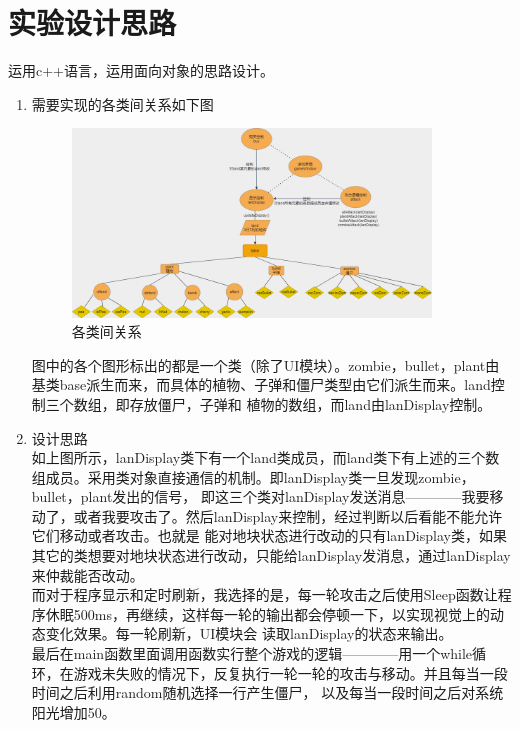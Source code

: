 \documentclass[12pt,a4paper,UTF8]{article}
\begin{document}
\section{实验设计思路}
    运用c++语言，运用面向对象的思路设计。
    \begin{enumerate}
      \item 需要实现的各类间关系如下图
          \begin{figure}[H]
            \centering
          \includegraphics[width=0.9\textwidth]{figure/UMI.png}
          \caption{各类间关系}
          \end{figure}
        图中的各个图形标出的都是一个类（除了UI模块）。zombie，bullet，plant由基类base派生而来，而具体的植物、子弹和僵尸类型由它们派生而来。land控制三个数组，即存放僵尸，子弹和
        植物的数组，而land由lanDisplay控制。
    \item 设计思路\\
        如上图所示，lanDisplay类下有一个land类成员，而land类下有上述的三个数组成员。采用类对象直接通信的机制。即lanDisplay类一旦发现zombie，bullet，plant发出的信号，
        即这三个类对lanDisplay发送消息————我要移动了，或者我要攻击了。然后lanDisplay来控制，经过判断以后看能不能允许它们移动或者攻击。也就是
        能对地块状态进行改动的只有lanDisplay类，如果其它的类想要对地块状态进行改动，只能给lanDisplay发消息，通过lanDisplay来仲裁能否改动。\\
        而对于程序显示和定时刷新，我选择的是，每一轮攻击之后使用Sleep函数让程序休眠500ms，再继续，这样每一轮的输出都会停顿一下，以实现视觉上的动态变化效果。每一轮刷新，UI模块会
        读取lanDisplay的状态来输出。\\
        最后在main函数里面调用函数实行整个游戏的逻辑————用一个while循环，在游戏未失败的情况下，反复执行一轮一轮的攻击与移动。并且每当一段时间之后利用random随机选择一行产生僵尸，
        以及每当一段时间之后对系统阳光增加50。
    \end{enumerate}
\end{document}
